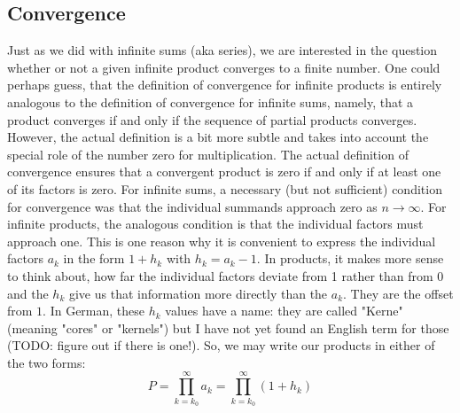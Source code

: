 \subsection{Convergence}
Just as we did with infinite sums (aka series), we are interested in the question whether or not a given infinite product converges to a finite number. One could perhaps guess, that the definition of convergence for infinite products is entirely analogous to the definition of convergence for infinite sums, namely, that a product converges if and only if the sequence of partial products converges. However, the actual definition is a bit more subtle and takes into account the special role of the number zero for multiplication. The actual definition of convergence ensures that a convergent product is zero if and only if at least one of its factors is zero. 
For infinite sums, a necessary (but not sufficient) condition for convergence was that the individual summands approach zero as $n \rightarrow \infty$. For infinite products, the analogous condition is that the individual factors must approach one. This is one reason why it is convenient to express the individual factors $a_k$ in the form $1 + h_k$ with $h_k = a_k - 1$. In products, it makes more sense to think about, how far the individual factors deviate from 1 rather than from 0 and the $h_k$ give us that information more directly than the $a_k$. They are the offset from $1$. In German, these $h_k$ values have a name: they are called "Kerne" (meaning "cores" or "kernels") but I have not yet found an English term for those (TODO: figure out if there is one!). So, we may write our products in either of the two forms:
\begin{equation}
 P = \prod_{k=k_0}^{\infty} a_k = \prod_{k=k_0}^{\infty} (1 + h_k) 
\end{equation}







